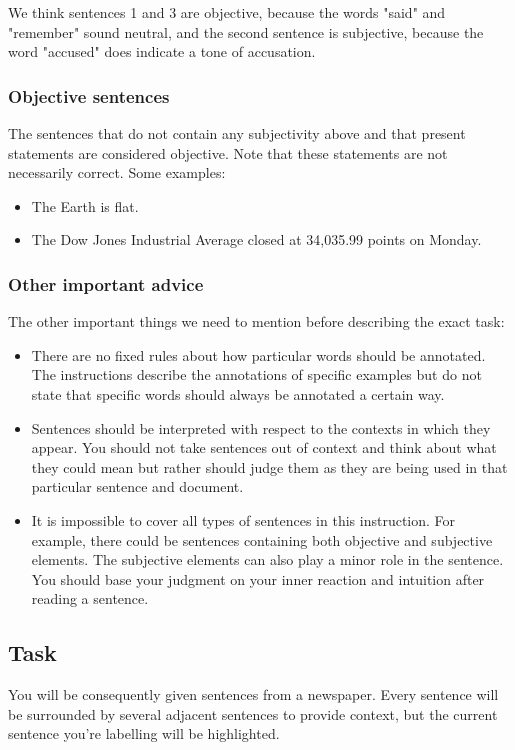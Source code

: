\documentclass[a4paper,14pt]{extarticle}
\begin{document}
We think sentences 1 and 3 are objective, because the words "said" and "remember" sound neutral, and the second sentence is subjective, because the word "accused" does indicate a tone of accusation.

\subsubsection*{Objective sentences}
The sentences that do not contain any subjectivity above and that present statements are considered objective. Note that these statements are not necessarily correct. Some examples:
\begin{itemize}
    \item The Earth is flat.
    \item The Dow Jones Industrial Average closed at 34,035.99 points on Monday.
\end{itemize}
\subsubsection*{Other important advice}
The other important things we need to mention before describing the exact task:
\begin{itemize}
    \item There are no fixed rules about how particular words should be annotated. The instructions describe the annotations of specific examples but do not state that specific words should always be annotated a certain way.
    \item Sentences should be interpreted with respect to the contexts in which they appear. You should not take sentences out of context and think about what they could mean but rather should judge them as they are being used in that particular sentence and document.
    \item It is impossible to cover all types of sentences in this instruction. For example, there could be sentences containing both objective and subjective elements. The subjective elements can also play a minor role in the sentence. You should base your judgment on your inner reaction and intuition after reading a sentence.
\end{itemize}
\subsection*{Task}
You will be consequently given sentences from a newspaper. Every sentence will be surrounded by several adjacent sentences to provide context, but the current sentence you're labelling will be highlighted.
\end{document}

